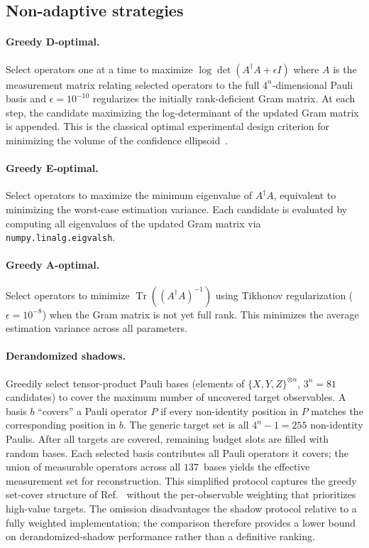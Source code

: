 \documentclass[twocolumn,prx,aps,superscriptaddress,longbibliography]{revtex4-2}
\begin{document}
\subsection{Non-adaptive strategies}

\paragraph{Greedy D-optimal.}
Select operators one at a time to maximize $\log\det(A^\dag A + \epsilon I)$
where $A$ is the measurement matrix relating selected operators to the
full $4^n$-dimensional Pauli basis and $\epsilon = 10^{-10}$ regularizes
the initially rank-deficient Gram matrix.  At each step, the candidate
maximizing the log-determinant of the updated Gram matrix is appended.
This is the classical optimal experimental design criterion for minimizing
the volume of the confidence ellipsoid~\cite{Pukelsheim2006}.

\paragraph{Greedy E-optimal.}
Select operators to maximize the minimum eigenvalue of $A^\dag A$,
equivalent to minimizing the worst-case estimation variance.  Each
candidate is evaluated by computing all eigenvalues of the updated
Gram matrix via \texttt{numpy.linalg.eigvalsh}.

\paragraph{Greedy A-optimal.}
Select operators to minimize $\operatorname{Tr}((A^\dag A)^{-1})$
using Tikhonov regularization ($\epsilon = 10^{-8}$) when the Gram
matrix is not yet full rank.  This minimizes the average estimation
variance across all parameters.

\paragraph{Derandomized shadows.}
Greedily select tensor-product Pauli bases (elements of
$\{X, Y, Z\}^{\otimes n}$, $3^n = 81$ candidates) to cover the
maximum number of uncovered target observables.  A basis $b$
``covers'' a Pauli operator $P$ if every non-identity position in
$P$ matches the corresponding position in $b$.  The generic target
set is all $4^n - 1 = 255$ non-identity Paulis.  After all targets
are covered, remaining budget slots are filled with random bases.
Each selected basis contributes all Pauli operators it covers;
the union of measurable operators across all $137$~bases yields the
effective measurement set for reconstruction.  This simplified
protocol captures the greedy set-cover structure of Ref.~\cite{Huang2021}
without the per-observable weighting that prioritizes
high-value targets.  The omission disadvantages the shadow protocol
relative to a fully weighted implementation; the comparison therefore
provides a lower bound on derandomized-shadow performance rather
than a definitive ranking.
\end{document}
